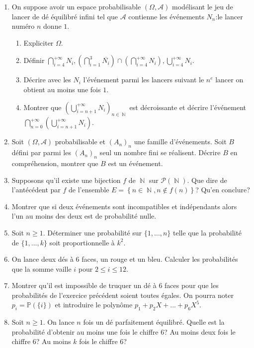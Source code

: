\documentclass[12pt,a4paper]{article}
\DeclareMathOperator{\N}{\mathbb{N}}
\newcommand{\tribu}{\mathcal{A}}
\renewcommand{\Pr}{\mathbb{P}}
\begin{document}
\begin{enumerate}
\item On suppose avoir un espace probabilisable $(\Omega,\tribu)$ modélisant le jeu de lancer de dé équilibré infini  tel que $\tribu$ contienne les événements $N_n$:\og le lancer numéro $n$ donne $1$\fg .
\begin{enumerate}
	\item Expliciter $\Omega$.
	\item 
	Définir $\displaystyle\bigcap_{i=4}^{+\infty}N_i,(\displaystyle\bigcap_{i=1}^{3}\overline{N_i})\cap(\displaystyle\bigcap_{i=4}^{+\infty}N_i),\displaystyle \bigcup_{i=4}^{+\infty}N_i$.
	\item
	Décrire avec les $N_i$ l'événement \og parmi les lancers suivant le $n^e$ lancer on obtient au moins une fois $1$\fg.
	\item Montrer que $\left(\displaystyle\bigcup_{i=n+1}^{+\infty}N_i\right)_{n\in\N}$ est décroissante et décrire l'événement $\displaystyle\bigcap_{n=0}^{+\infty}\left(\displaystyle\bigcup_{i=n+1}^{+\infty}N_i\right)$.
\end{enumerate}


\item
Soit $(\Omega,\tribu)$ probabilisable et $(A_n)_n$ une famille d'événements. Soit $B$ défini par \og parmi les $(A_n)_n$ seul un nombre fini se réalisent\fg. Décrire $B$ en compréhension, montrer que $B$ est un événement.

\item
Supposons qu'il existe une bijection $f$ de $\N$ sur $\mathcal{P}(\N)$. Que dire de l'antécédent par $f$ de l'ensemble $E=\left\{n\in\N,n\notin f(n)\right\}$? Qu'en conclure?

\item
	Montrer que si deux événements sont incompatibles et indépendants alors l'un au moins des deux est de probabilité nulle.
\item Soit $n\geq 1$. Déterminer une probabilité sur $\{1,\dots,n\}$ telle que la probabilité de $\{1,\dots,k\}$ soit proportionnelle à $k^2$.


\item On lance deux dés à 6 faces, un rouge et un bleu. Calculer les probabilités que la somme vaille $i$ pour $2\leqslant i \leqslant 12$.
\item Montrer qu'il est impossible de truquer un dé à $6$ faces pour que les probabilités de l'exercice précédent soient toutes égales. On pourra noter $p_i=\Pr(\{i\})$ et introduire le polynôme $p_1+p_2X+...+p_6X^5$.

\item
Soit $n\geq 1$. On lance $n$ fois un dé parfaitement équilibré. Quelle est la probabilité d'obtenir au moins une fois le chiffre 6? Au moins deux fois le chiffre 6? Au moins $k$ fois le chiffre 6?


\end{enumerate}
\end{document}
